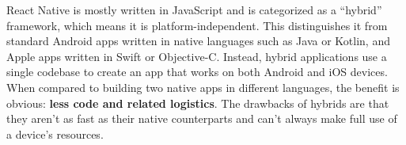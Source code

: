 React Native is mostly written in JavaScript and is categorized as a ``hybrid'' framework, which means it is
platform-independent.
This distinguishes it from standard Android apps written in native languages such as Java or Kotlin, and Apple
apps written in Swift or Objective-C. Instead, hybrid applications use a single codebase to create an app that
works on both Android and iOS devices.
When compared to building two native apps in different languages, the benefit is obvious: \textbf{less code and
related logistics}.
The drawbacks of hybrids are that they aren't as fast as their native counterparts and can't always make full use
of a device's resources.
